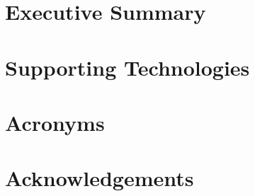 \documentclass[ %
                author={Ainsley Rutterford},
                supervisor={Dr. Tilo Burghardt},
                degree={MEng},
                title={Coral Density Analysis using Deep Learning},
                subtitle={},
                type={research},
                year={2020} ]{dissertation}
\begin{document}

\maketitle


\frontmatter


\makedecl


\tableofcontents

\chapter*{Executive Summary}


\chapter*{Supporting Technologies}


\chapter*{Acronyms}


\chapter*{Acknowledgements}

\end{document}
